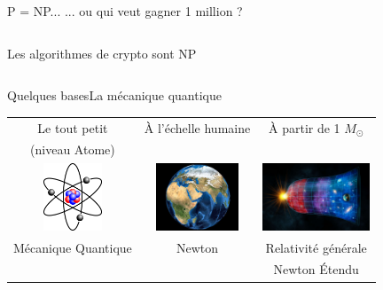 \documentclass{beamer}
\begin{document}
\begin{frame}{P = NP... }{... ou qui veut gagner 1 million ?}
  \begin{columns}
    \begin{column}{0.5\textwidth}
      Les algorithmes de crypto sont NP
    \end{column}
    
    \begin{column}{0.5\textwidth}
    \end{column}
  \end{columns}
\end{frame}

\begin{frame}{Quelques bases}{La m\'{e}canique quantique}
  \begin{center}
    \begin{tabular}{ c c c }
      Le tout petit & \`{A} l'\'echelle humaine  & \`{A} partir de 1 \(M_\odot\) \\
      (niveau Atome) & & \\
      \includegraphics[height=2cm]{Atome_lithium_rutherford.png} & \includegraphics[height=2cm]{TerreWorldWind.jpg} & \includegraphics[height=2cm]{04-965413833409_COI.jpeg}\\
      M\'ecanique Quantique & Newton & Relativit\'e g\'en\'erale \\
       &  & Newton \'Etendu \\
    \end{tabular}
  \end{center}
\end{frame}
\end{document}
